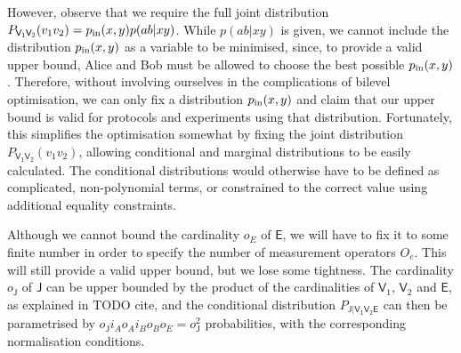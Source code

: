 \documentclass[10pt, a4paper]{article}
\numberwithin{equation}{section} %
\theoremstyle{definition}
\theoremstyle{plain}
\newcommand{\?}{\mathrel{?}} %
\newcommand{\crv}[1]{\mathsf{#1}}
\begin{document}
    However, observe that we require the full joint distribution \(P_{\crv{V_1V_2}}(v_1v_2) = p_{\rm in}(x,y)p(ab|xy)\). While \(p(ab|xy)\) is given, we cannot include the distribution \(p_{\rm in}(x,y)\) as a variable to be minimised, since, to provide a valid upper bound, Alice and Bob must be allowed to choose the best possible \(p_{\rm in}(x,y)\). Therefore, without involving ourselves in the complications of bilevel optimisation, we can only fix a distribution \(p_{\rm in}(x,y)\) and claim that our upper bound is valid for protocols and experiments using that distribution. Fortunately, this simplifies the optimisation somewhat by fixing the joint distribution \(P_{\crv{V_1V_2}}(v_1v_2)\), allowing conditional and marginal distributions to be easily calculated. The conditional distributions would otherwise have to be defined as complicated, non-polynomial terms, or constrained to the correct value using additional equality constraints.

    Although we cannot bound the cardinality \(o_E\) of \(\crv{E}\), we will have to fix it to some finite number in order to specify the number of measurement operators \(O_e\). This will still provide a valid upper bound, but we lose some tightness. The cardinality \(o_{\crv{J}}\) of \(\crv{J}\) can be upper bounded by the product of the cardinalities of \(\crv{V}_1\), \(\crv{V}_2\) and \(\crv{E}\), as explained in TODO cite, and the conditional distribution \(P_{\crv{J|V_1V_2E}}\) can then be parametrised by \(o_{\crv{J}} i_A o_A i_B o_B o_E = o_{\crv{J}}^2\) probabilities, with the corresponding normalisation conditions.
\end{document}
